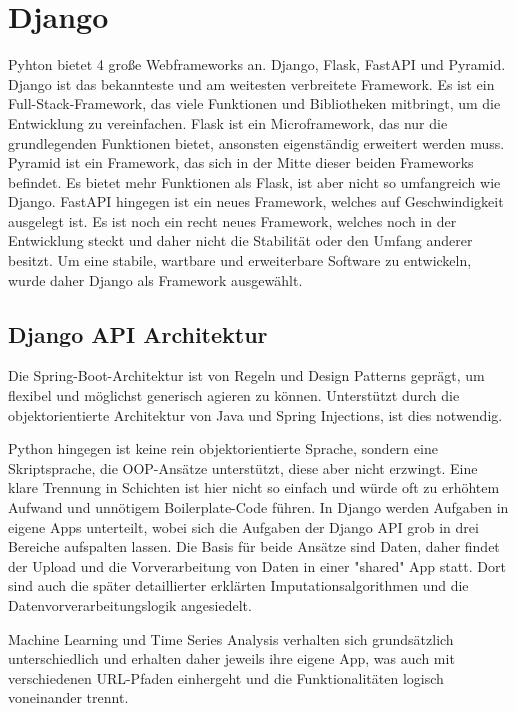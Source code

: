 
\section{Django}
Pyhton bietet 4 große Webframeworks an. Django, Flask, FastAPI und Pyramid. 
Django ist das bekannteste und am weitesten verbreitete Framework. Es ist ein Full-Stack-Framework, 
das viele Funktionen und Bibliotheken mitbringt, um die Entwicklung zu vereinfachen. Flask ist ein Microframework, das nur die grundlegenden Funktionen bietet, ansonsten eigenständig erweitert werden muss.
Pyramid ist ein Framework, das sich in der Mitte dieser beiden Frameworks befindet. Es bietet mehr Funktionen als Flask, ist aber nicht so umfangreich wie Django. 
FastAPI hingegen ist ein neues Framework, welches auf Geschwindigkeit ausgelegt ist. Es ist noch ein recht neues Framework, welches noch in der Entwicklung steckt und daher nicht die Stabilität oder den Umfang anderer besitzt.
Um eine stabile, wartbare und erweiterbare Software zu entwickeln, wurde daher Django als Framework ausgewählt.

\subsection{Django API Architektur}
Die Spring-Boot-Architektur ist von Regeln und Design Patterns geprägt, um flexibel und möglichst generisch agieren zu können. 
Unterstützt durch die objektorientierte Architektur von Java und Spring Injections, ist dies notwendig.

Python hingegen ist keine rein objektorientierte Sprache, sondern eine Skriptsprache, die OOP-Ansätze unterstützt, diese aber nicht erzwingt. 
Eine klare Trennung in Schichten ist hier nicht so einfach und würde oft zu erhöhtem Aufwand und unnötigem Boilerplate-Code führen. In Django werden Aufgaben in eigene Apps unterteilt, 
wobei sich die Aufgaben der Django API grob in drei Bereiche aufspalten lassen. Die Basis für beide Ansätze sind Daten, daher findet der Upload und die Vorverarbeitung von Daten in einer 
"shared" App statt. Dort sind auch die später detaillierter erklärten Imputationsalgorithmen und die Datenvorverarbeitungslogik angesiedelt.

Machine Learning und Time Series Analysis verhalten sich grundsätzlich unterschiedlich und erhalten daher jeweils ihre eigene App, was auch mit verschiedenen URL-Pfaden einhergeht und die Funktionalitäten logisch voneinander trennt.

